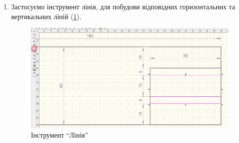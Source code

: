 \begin{enumerate}[leftmargin=*]
\item Застосуємо інструмент лінія, для побудови відповідних горизонтальних та вертикальних ліній
  (\ref{fig:lab2:line}).
  \begin{figure}[!htb]
    \centering \includegraphics[width=0.7\linewidth]{./images/lab2/fourth_step.png}
    \caption{Інструмент ``Лінія''}
    \label{fig:lab2:line}
  \end{figure}
  \FloatBarrier


\end{enumerate}
